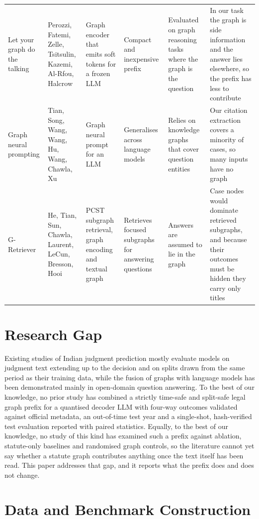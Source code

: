 \documentclass[11pt,a4paper]{article}
\begin{document}
\begin{landscape}
\begin{longtable}{@{}Y{3.2cm}Y{2.5cm}Y{4.3cm}Y{4cm}Y{4cm}Y{5.2cm}@{}}
Let your graph do the talking \cite{r21} & Perozzi, Fatemi, Zelle, Tsitsulin, Kazemi, Al-Rfou, Halcrow & Graph encoder that emits soft tokens for a frozen LLM & Compact and inexpensive prefix & Evaluated on graph reasoning tasks where the graph is the question & In our task the graph is side information and the answer lies elsewhere, so the prefix has less to contribute\\
Graph neural prompting \cite{r22} & Tian, Song, Wang, Wang, Hu, Wang, Chawla, Xu & Graph neural prompt for an LLM & Generalises across language models & Relies on knowledge graphs that cover question entities & Our citation extraction covers a minority of cases, so many inputs have no graph\\
G-Retriever \cite{r23} & He, Tian, Sun, Chawla, Laurent, LeCun, Bresson, Hooi & PCST subgraph retrieval, graph encoding and textual graph & Retrieves focused subgraphs for answering questions & Answers are assumed to lie in the graph & Case nodes would dominate retrieved subgraphs, and because their outcomes must be hidden they carry only titles\\
\end{longtable}
\end{landscape}

\section{Research Gap}\label{sec:gap}
Existing studies of Indian judgment prediction mostly evaluate models on judgment text extending up to the decision and on splits drawn from the same period as their training data, while the fusion of graphs with language models has been demonstrated mainly in open-domain question answering. To the best of our knowledge, no prior study has combined a strictly time-safe and split-safe legal graph prefix for a quantised decoder LLM with four-way outcomes validated against official metadata, an out-of-time test year and a single-shot, hash-verified test evaluation reported with paired statistics. Equally, to the best of our knowledge, no study of this kind has examined such a prefix against ablation, statute-only baselines and randomised graph controls, so the literature cannot yet say whether a statute graph contributes anything once the text itself has been read. This paper addresses that gap, and it reports what the prefix does and does not change.

\section{Data and Benchmark Construction}\label{sec:data}
\end{document}
